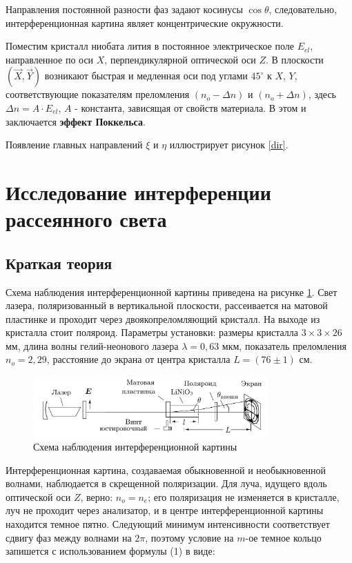 	
	Направления постоянной разности фаз задают косинусы $\cos\theta$, следовательно, интерференционная картина являет концентрические окружности. 
	
	Поместим кристалл ниобата лития в постоянное электрическое поле $E_{el}$, направленное по оси $X$, перпендикулярной оптической оси $Z$. В плоскости $(\overrightarrow{X}, \overrightarrow{Y})$ возникают быстрая и медленная оси под углами $45^\circ$ к $X$, $Y$, соответствующие показателям преломления $(n_o - \Delta n)$ и $(n_o + \Delta n)$, здесь $\Delta n = A\cdot E_{el}$, $A$ - константа, зависящая от свойств материала. В этом и заключается \textbf{эффект Поккельса}. 
	
	Появление главных направлений $\xi$ и $\eta$ иллюстрирует рисунок \ref{dir}. 
	
	\section{Исследование интерференции рассеянного света}
	\subsection{Краткая теория}
	
	Схема наблюдения интерференционной картины приведена на рисунке \ref{shema}. Свет лазера, поляризованный в вертикальной плоскости, рассеивается на матовой пластинке и проходит через двоякопреломляющий кристалл. На выходе из кристалла стоит поляроид. Параметры установки: размеры кристалла $3 \times 3 \times 26$ мм, длина волны гелий-неонового лазера $\lambda = 0,63$ мкм, показатель преломления $n_o = 2,29$, расстояние до экрана от центра кристалла $L = (76 \pm 1)$ см. 
	
	\begin{figure}[h!]
		\centering	
		\includegraphics[width=0.8\textwidth]{pics/shema.png}
		\caption{Схема наблюдения интерференционной картины}
		\label{shema}
	\end{figure}
	
	Интерференционная картина, создаваемая обыкновенной и необыкновенной волнами, наблюдается в скрещенной поляризации. Для луча, идущего вдоль оптической оси $Z$, верно: $n_o = n_e$; его поляризация не изменяется в кристалле, луч не проходит через анализатор, и в центре интерференционной картины находится темное пятно. Следующий минимум интенсивности соответствует сдвигу фаз между волнами на $2\pi$, поэтому условие на $m$-ое темное кольцо запишется с использованием формулы (1) в виде:
	
